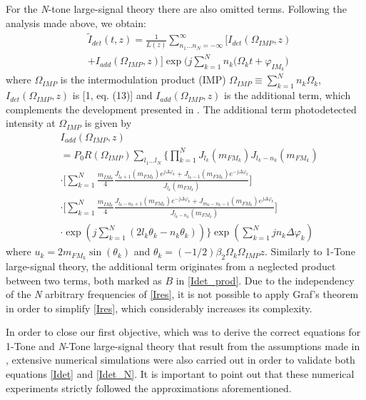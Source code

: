 \documentclass[journal]{IEEEtran}
\begin{document}
For the \emph{N}-tone large-signal theory there are also omitted terms. Following the analysis made above, we obtain:
\begin{align} \label{Idet_N} \nonumber
& \tilde{I}_{det}(t,z) = \frac{1}{L(z)}\sum_{n_1 \ldots n_N = -\infty}^{\infty} \bigg[I_{det}(\Omega_{IMP},z) \\
& + I_{add}(\Omega_{IMP},z)\bigg]\exp\bigg(j\sum_{k = 1}^N n_k(\Omega_kt + \varphi_{IM_k}\bigg)
\end{align}
where $\Omega_{IMP}$ is the intermodulation product (IMP) $\Omega_{IMP} \equiv \sum_{k = 1}^N n_k\Omega_k$, $I_{det}(\Omega_{IMP},z)$ is [1, eq. (13)] and $I_{add}(\Omega_{IMP},z)$ is the additional term, which complements the development presented in \cite{eva}. The additional term photodetected intensity at $\Omega_{IMP}$ is given by
\begin{align} \nonumber \label{Ires}
& I_{add}(\Omega_{IMP},z) \\ \nonumber
& = P_0R(\Omega_{IMP})\displaystyle\sum_{l_1 \ldots l_N}\bigg\lbrace\prod_{k = 1}^NJ_{l_k}(m_{FM_k})J_{l_k - n_k}(m_{FM_k}) \\ \nonumber
& \cdot\bigg[\sum_{k = 1}^N\textstyle\frac{m_{IM_k}}{4}\frac{J_{l_k+1}(m_{FM_k})e^{j\Delta\varphi_k} + J_{l_k-1}(m_{FM_k})e^{-j\Delta\varphi_k}}{J_{l_k}(m_{FM_k})}\bigg] \\ \nonumber
& \cdot\bigg[\sum_{k = 1}^N\textstyle\frac{m_{IM_k}}{4}\frac{J_{	l_k-n_k+1}(m_{FM_k})e^{-j\Delta\varphi_k} + J_{m_k-n_k-1}(m_{FM_k})e^{j\Delta\varphi_k}}{J_{l_k-n_k}(m_{FM_k})}\bigg] \\
& \cdot\exp(j\textstyle\sum_{k = 1}^N (2l_k\theta_k - n_k\theta_k))\bigg\rbrace\exp(\textstyle\sum_{k=1}^Njn_k\Delta\varphi_k)
\end{align}
where $u_k = 2m_{FM_k}\sin{(\theta_k)}$ and $\theta_k = (-1/2)\beta_2\Omega_k\Omega_{IMP}z$. Similarly to 1-Tone large-signal theory, the additional term originates from a neglected product between two terms, both marked as $B$ in \eqref{Idet_prod}. Due to the independency of the \emph{N} arbitrary frequencies of \eqref{Ires}, it is not possible to apply Graf’s theorem in order to simplify \eqref{Ires}, which considerably increases its complexity. 

In order to close our first objective, which was to derive the correct equations for 1-Tone and \emph{N}-Tone large-signal theory that result from the assumptions made in \cite{eva}, extensive numerical simulations were also carried out in order to validate both equations \eqref{Idet} and \eqref{Idet_N}. It is important to point out that these numerical experiments strictly followed the approximations aforementioned. 
\end{document}
